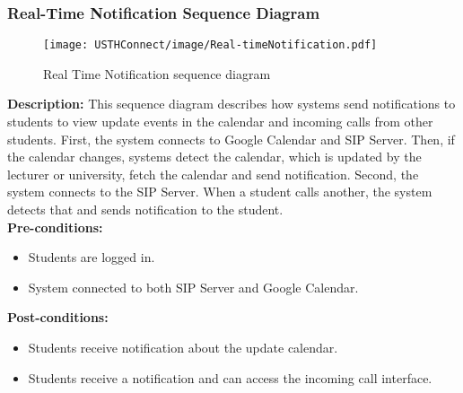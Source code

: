 \subsubsection{Real-Time Notification Sequence Diagram}
\begin{figure}[H]
    \centering
    \texttt{[image: USTHConnect/image/Real-timeNotification.pdf]} 
    \caption{Real Time Notification sequence diagram}
    \label{fig:noti_sequence}
\end{figure}

\textbf{Description:} This sequence diagram describes how systems send notifications to students to view update events in the calendar and incoming calls from other students. 
First, the system connects to Google Calendar and SIP Server. 
Then, if the calendar changes, systems detect the calendar, which is updated by the lecturer or university, fetch the calendar and send notification. 
Second, the system connects to the SIP Server. When a student calls another, the system detects that and sends notification to the student. \\

\noindent \textbf{Pre-conditions:} 
    \begin{itemize}
        \item Students are logged in.
        \item System connected to both SIP Server and Google Calendar.
    \end{itemize}
\noindent \textbf{Post-conditions:}
\begin{itemize}
    \item Students receive notification about the update calendar.
    \item Students receive a notification and can access the incoming call interface.
\end{itemize}
